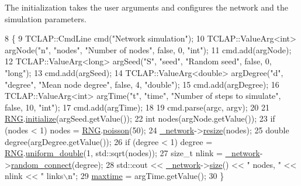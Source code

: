 The initialization takes the user arguments and configures the network and the simulation parameters. 
\begin{DoxyCode}
8                                                  \{
9     TCLAP::CmdLine cmd(\textcolor{stringliteral}{"Network simulation"});
10     TCLAP::ValueArg<int> argNode(\textcolor{stringliteral}{"n"}, \textcolor{stringliteral}{"nodes"}, \textcolor{stringliteral}{"Number of nodes"}, \textcolor{keyword}{false}, 0, \textcolor{stringliteral}{"int"});
11     cmd.add(argNode);
12     TCLAP::ValueArg<long> argSeed(\textcolor{stringliteral}{"S"}, \textcolor{stringliteral}{"seed"}, \textcolor{stringliteral}{"Random seed"}, \textcolor{keyword}{false}, 0, \textcolor{stringliteral}{"long"});
13     cmd.add(argSeed);
14     TCLAP::ValueArg<double> argDegree(\textcolor{stringliteral}{"d"}, \textcolor{stringliteral}{"degree"}, \textcolor{stringliteral}{"Mean node degree"}, \textcolor{keyword}{false}, 4, \textcolor{stringliteral}{"double"});
15     cmd.add(argDegree);
16     TCLAP::ValueArg<int> argTime(\textcolor{stringliteral}{"t"}, \textcolor{stringliteral}{"time"}, \textcolor{stringliteral}{"Number of steps to simulate"}, \textcolor{keyword}{false}, 10, \textcolor{stringliteral}{"int"});
17     cmd.add(argTime);
18 
19     cmd.parse(argc, argv);
20 
21     \mbox{\hyperlink{main_8cpp_aa68627d02426951087dcb2ed1f32099c}{RNG}}.\mbox{\hyperlink{classRandomNumbers_a9ee407185ec3f4e1a165edadb42c38e6}{initialize}}(argSeed.getValue());
22     \textcolor{keywordtype}{int} nodes(argNode.getValue());
23     \textcolor{keywordflow}{if} (nodes < 1) nodes = \mbox{\hyperlink{main_8cpp_aa68627d02426951087dcb2ed1f32099c}{RNG}}.\mbox{\hyperlink{classRandomNumbers_a69e33058b8a923f9597cf13421d5fcd4}{poisson}}(50);
24     \mbox{\hyperlink{classSimulation_a5f1d8152b13bc4640c8a3fddcfe7eae9}{\_network}}->\mbox{\hyperlink{classNetwork_a8f0092f24eaab8c8ab07745743b4ce8b}{resize}}(nodes);
25     \textcolor{keywordtype}{double} degree(argDegree.getValue());
26     \textcolor{keywordflow}{if} (degree < 1) degree = \mbox{\hyperlink{main_8cpp_aa68627d02426951087dcb2ed1f32099c}{RNG}}.\mbox{\hyperlink{classRandomNumbers_ae226c129494f9055ac37ed1af943d010}{uniform\_double}}(1, std::sqrt(nodes));
27     \textcolor{keywordtype}{size\_t} nlink = \mbox{\hyperlink{classSimulation_a5f1d8152b13bc4640c8a3fddcfe7eae9}{\_network}}->\mbox{\hyperlink{classNetwork_aab69fcd3971532b165c4a4ff7df4b81c}{random\_connect}}(degree);
28     std::cout << \mbox{\hyperlink{classSimulation_a5f1d8152b13bc4640c8a3fddcfe7eae9}{\_network}}->\mbox{\hyperlink{classNetwork_a41c54d12d861883170b5c5abca3a7bc8}{size}}() << \textcolor{stringliteral}{" nodes, "} << nlink << \textcolor{stringliteral}{" links\(\backslash\)n"};
29     \mbox{\hyperlink{classSimulation_a2db45338d73f8e7823eb85015532be23}{maxtime}} = argTime.getValue();
30 \}
\end{DoxyCode}
\mbox{\label{classSimulation_a261acbceff8d384ea12cb010798504b2}} 
